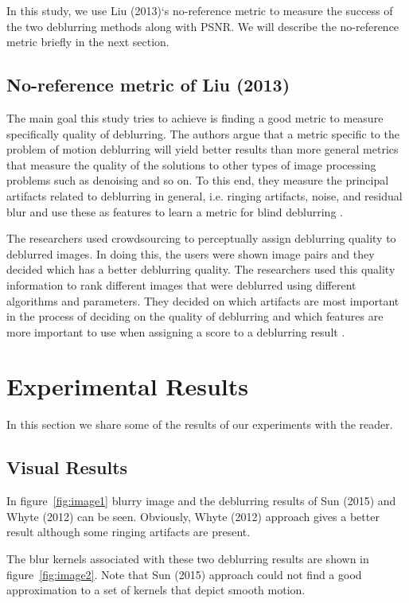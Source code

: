 \documentclass[10pt,twocolumn,letterpaper]{article}
\begin{document}
In this study, we use Liu \etal (2013)`s no-reference metric to measure the success of the two deblurring methods along with PSNR. We will describe the no-reference metric briefly in the next section.

\subsection{No-reference metric of Liu \textbf{\etal} (2013)}
The main goal this study tries to achieve is finding a good metric to measure specifically quality of deblurring. The authors argue that a metric specific to the problem of motion deblurring will yield better results than more general metrics that measure the quality of the solutions to other types of image processing problems such as denoising and so on. To this end, they measure the principal artifacts related to deblurring in general, i.e. ringing artifacts, noise, and residual blur and use these as features to learn a metric for blind deblurring \cite{liu2013no}.

The researchers used crowdsourcing to perceptually assign deblurring quality to deblurred images. In doing this, the users were shown image pairs and they decided which has a better deblurring quality. The researchers used this quality information to rank different images that were deblurred using different algorithms and parameters. They decided on which artifacts are most important in the process of deciding on the quality of deblurring and which features are more important to use when assigning a score to a deblurring result \cite{liu2013no}.

\section{Experimental Results}

In this section we share some of the results of our experiments with the reader. 

\subsection{Visual Results}

In figure~\ref{fig:image1} blurry image and the deblurring results of Sun \etal (2015) and Whyte \etal (2012) can be seen. Obviously, Whyte \etal (2012) approach gives a better result although some ringing artifacts are present.

The blur kernels associated with these two deblurring results are shown in figure~\ref{fig:image2}. Note that Sun \etal (2015) approach could not find a good approximation to a set of kernels that depict smooth motion.
\end{document}
